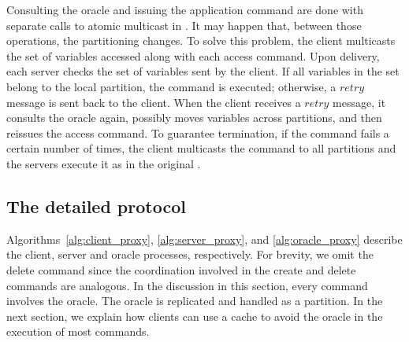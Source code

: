 Consulting the oracle and issuing the application command are done with separate calls to atomic multicast in \dssmr{}.
It may happen that, between those operations, the partitioning changes.
To solve this problem, the client multicasts the set of variables accessed along with each access command.
Upon delivery, each server checks the set of variables sent by the client.
If all variables in the set belong to the local partition, the command is executed; otherwise, a $retry$ message is sent back to the client.
When the client receives a $retry$ message, it consults the oracle again, possibly moves variables across partitions, and then reissues the access command.
To guarantee termination, if the command fails a certain number of times, the client multicasts the command to all partitions and the servers execute it as in the original \ssmr{}.



\subsection{The detailed protocol}

Algorithms~\ref{alg:client_proxy}, \ref{alg:server_proxy}, and \ref{alg:oracle_proxy} describe the client, server and oracle processes, respectively. 
For brevity, we omit the delete command since the coordination involved in the create and delete commands are analogous. 
In the discussion in this section, every command involves the oracle.
The oracle is replicated and handled as a partition.
In the next section, we explain how clients can use a cache to avoid the oracle in the execution of most commands.




